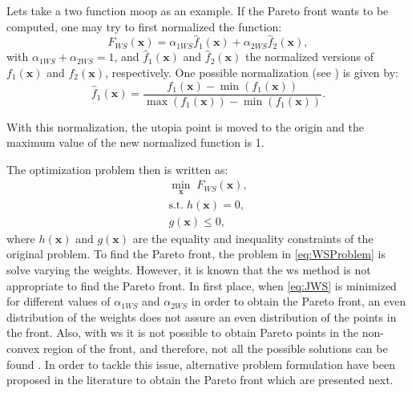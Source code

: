 Lets take a two function \gls{moop} as an example. If the Pareto front wants to be computed, one may try to first normalized the function:
\begin{equation}
F_{WS}(\mathbf{x}) = \alpha_{1WS} \hat{f}_{1}(\mathbf{x}) + \alpha_{2WS} \hat{f}_{2}(\mathbf{x}),
\label{eq:JWS}
\end{equation}
with $\alpha_{1WS} + \alpha_{2WS}=1$, and $\hat{f}_{1}(\mathbf{x})$ and $\hat{f}_{2}(\mathbf{x})$ the normalized versions of $f_{1}(\mathbf{x})$ and $f_{2}(\mathbf{x})$, respectively. One possible normalization (see \citet{Marler2004}) is given by:
\begin{equation}
\hat{f}_{1}(\mathbf{x}) = \frac{f_{1}(\mathbf{x})-\min{\left( f_{1}(\mathbf{x})\right) }}{\max{(f_{1}(\mathbf{x}))}-\min{\left( f_{1}(\mathbf{x})\right) }}.
\label{eq:NormalizedJ}
\end{equation}

With this normalization, the utopia point is moved to the origin and the maximum value of the new normalized function is 1.

The optimization problem then is written as:
\begin{equation}
\begin{gathered}
\min_{\mathbf{x}}{\; F_{WS}(\mathbf{x})}, \\
\text{s.t.} \; h(\mathbf{x})=0, \\
g(\mathbf{x}) \leq 0,
\end{gathered}
\label{eq:WSProblem}
\end{equation}
%
where $h(\mathbf{x})$ and $g(\mathbf{x})$ are the equality and inequality constraints of the original problem. To find the Pareto front, the problem in \eqref{eq:WSProblem} is solve varying the weights. However, it is known that the \gls{ws} method is not appropriate to find the Pareto front. In first place, when \eqref{eq:JWS} is minimized for different values of $\alpha_{1WS}$ and $\alpha_{2WS}$ in order to obtain the Pareto front, an even distribution of the weights does not assure an even distribution of the points in the front. Also, with \gls{ws} it is not possible to obtain Pareto points in the non-convex region of the front, and therefore, not all the possible solutions can be found \citep{Das1997}. In order to tackle this issue, alternative problem formulation have been proposed in the literature to obtain the Pareto front which are presented next.
